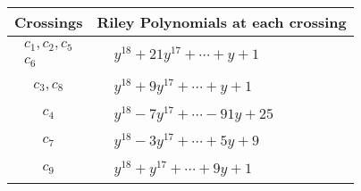 \documentclass[1p]{elsarticle_modified}
\theoremstyle{definition}
\begin{document}
\begin{tabular}{m{50pt}|m{274pt}}
Crossings & \hspace{64pt}Riley Polynomials at each crossing \\
\hline $$\begin{aligned}c_{1},c_{2},c_{5}\\c_{6}\end{aligned}$$&$\begin{aligned}
&y^{18}+21 y^{17}+\cdots+y+1
\end{aligned}$\\
\hline $$\begin{aligned}c_{3},c_{8}\end{aligned}$$&$\begin{aligned}
&y^{18}+9 y^{17}+\cdots+y+1
\end{aligned}$\\
\hline $$\begin{aligned}c_{4}\end{aligned}$$&$\begin{aligned}
&y^{18}-7 y^{17}+\cdots-91 y+25
\end{aligned}$\\
\hline $$\begin{aligned}c_{7}\end{aligned}$$&$\begin{aligned}
&y^{18}-3 y^{17}+\cdots+5 y+9
\end{aligned}$\\
\hline $$\begin{aligned}c_{9}\end{aligned}$$&$\begin{aligned}
&y^{18}+y^{17}+\cdots+9 y+1
\end{aligned}$\\
\hline
\end{tabular}
\vskip 2pc
\end{document}
